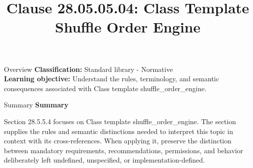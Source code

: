 \documentclass[10pt,letterpaper]{article}
\title{Clause 28.05.05.04: Class Template Shuffle Order Engine}
\author{}
\date{}
\begin{document}
\maketitle
\begin{CornellOverviewBox}{Overview}
\textbf{Classification:} Standard library - Normative\\[2pt]
\textbf{Learning objective:} Understand the rules, terminology, and semantic consequences associated with Class template shuffle\_order\_engine.
\end{CornellOverviewBox}\begin{CornellSummaryBox}{Summary}
{\sffamily\bfseries\color{Accent} Summary}\par\vspace{3pt}Section 28.5.5.4 focuses on Class template shuffle\_order\_engine. The section supplies the rules and semantic distinctions needed to interpret this topic in context with its cross-references. When applying it, preserve the distinction between mandatory requirements, recommendations, permissions, and behavior deliberately left undefined, unspecified, or implementation-defined.
\end{CornellSummaryBox}
\end{document}
